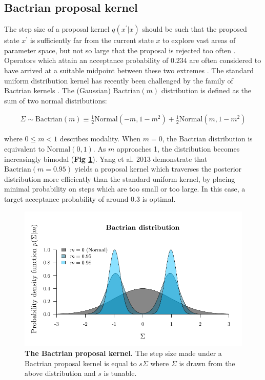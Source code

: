 \documentclass[10pt,letterpaper]{article}
\begin{document}
\clearpage
\subsection*{Bactrian proposal kernel} \label{sect:randomwalks}



The step size of a proposal kernel $q(x^\prime|x)$ should be such that the proposed state $x^\prime$ is sufficiently far from the current state $x$ to explore vast areas of parameter space, but not so large that the proposal is rejected too often \cite{roberts1997weak}. 
Operators which attain an acceptance probability of 0.234 are often considered to have arrived at a suitable midpoint between these two extremes \cite{bouckaert2019beast, roberts1997weak}.
The standard uniform distribution kernel has recently been challenged by the family of Bactrian kernels \cite{yang2013searching, thawornwattana2018designing}.
The (Gaussian) $\text{Bactrian}(m)$ distribution is defined as the sum of two normal distributions:


\begin{align}
	\Sigma \sim \text{Bactrian}(m) \equiv \frac{1}{2}\text{Normal}(-m, 1-m^2) + \frac{1}{2}\text{Normal}(m, 1-m^2)
\end{align}


\noindent
where $0 \leq m < 1$ describes modality. 
When $m=0$, the Bactrian distribution is equivalent to $\text{Normal}(0, 1)$. 
As $m$ approaches 1, the distribution becomes increasingly bimodal (\textbf{Fig \ref{fig:bactrian}}). 
Yang et al. 2013 \cite{yang2013searching} demonstrate that $\text{Bactrian}(m=0.95)$ yields a proposal kernel which traverses the posterior distribution more efficiently than the standard uniform kernel, by placing minimal probability on steps which are too small or too large.
In this case, a target acceptance probability of around 0.3 is optimal.


\begin{figure}[!h]
\includegraphics[width=\textwidth]{Figures/bactrian.pdf}
\caption{\textbf{The Bactrian proposal kernel.} The step size made under a Bactrian proposal kernel is equal to $s \Sigma$ where $\Sigma$ is drawn from the above distribution and $s$ is tunable.   }
\label{fig:bactrian}
\end{figure}
\end{document}
